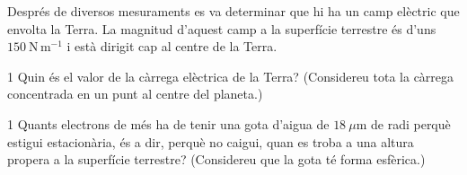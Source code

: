 Després de diversos mesuraments es va determinar que hi ha un camp elèctric que envolta la Terra. La magnitud d'aquest camp a la superfície terrestre és d'uns $150\ \mathrm{N\,m^{-1}}$ i està dirigit cap al centre de la Terra.

\begin{apartat}{1}
Quin és el valor de la càrrega elèctrica de la Terra? (Considereu tota la càrrega concentrada en un punt al centre del planeta.)
\end{apartat}

\begin{apartat}{1}
Quants electrons de més ha de tenir una gota d'aigua de $18\ \mu\mathrm{m}$ de radi perquè estigui estacionària, és a dir, perquè no caigui, quan es troba a una altura propera a la superfície terrestre? (Considereu que la gota té forma esfèrica.)
\end{apartat}

